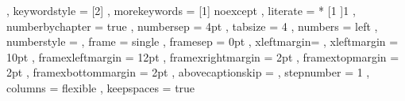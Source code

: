 {,	keywordstyle     = [2]\lst@ifdisplaystyle\color{msvc_stl}\fi
,   morekeywords     = [1]{ noexcept }
,	literate         = *
			{[}{{\lst@ifdisplaystyle\color{msvc_operators}\fi{[}}}{1}
            {]}{{\lst@ifdisplaystyle\color{msvc_operators}\fi{]}}}{1}
,   numberbychapter  = true
,   numbersep        =  4pt
,   tabsize          =  4
,   numbers          = left
,   numberstyle      = \tiny\color{msvc_linenumber}\noncopynumber
,   frame            = single
,   framesep         =  0pt
,   xleftmargin=\parindent
,   xleftmargin      = 10pt
,   framexleftmargin = 12pt
,   framexrightmargin = 2pt
,   framextopmargin  =  2pt
,   framexbottommargin = 2pt
,   abovecaptionskip = \medskipamount
,   stepnumber       = 1
,   columns          = flexible
,   keepspaces       = true
}
